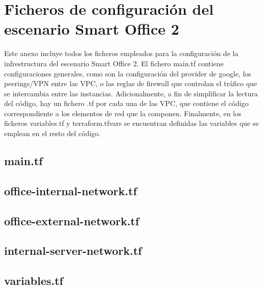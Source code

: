\chapter{Ficheros de configuración del escenario Smart Office 2} \label{sec:anxB}
  Este anexo incluye todos los ficheros empleados para la configuración de la infrestructura del escenario Smart Office 2. El fichero main.tf contiene configuraciones generales, como son la configuración del provider de google, los peerings/VPN entre las VPC, o las reglas de firewall que controlan el tráfico que se intercambia entre las instancias. Adicionalmente, a fin de simplificar la lectura del código, hay un fichero .tf por cada una de las VPC, que contiene el código correspondiente a los elementos de red que la componen. Finalmente, en los ficheros variables.tf y terraform.tfvars se encuentran definidas las variables que se emplean en el resto del código.

\section*{main.tf} 


\section*{office-internal-network.tf}


\section*{office-external-network.tf}


\section*{internal-server-network.tf}


\section*{variables.tf}


